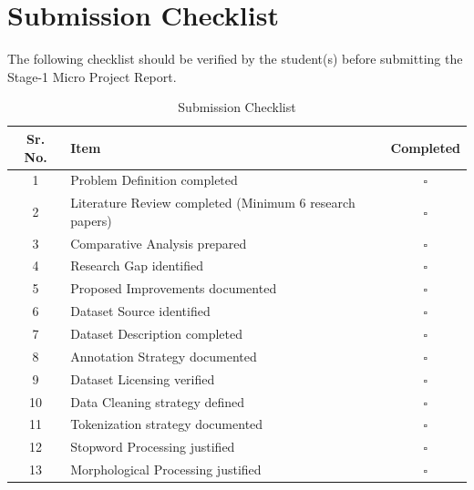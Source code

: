 \chapter*{Submission Checklist}
The following checklist should be verified by the student(s) before submitting the Stage-1 Micro Project Report.
\renewcommand{\arraystretch}{1}

\begin{table}[H]
\centering
\caption{Submission Checklist}
\begin{tabular}{|c|p{10cm}|c|}
\hline
\textbf{Sr. No.} & \textbf{Item} & \textbf{Completed} \\
\hline

1 & Problem Definition completed & $\square$ \\ \hline

2 & Literature Review completed (Minimum 6 research papers) & $\square$ \\ \hline

3 & Comparative Analysis prepared & $\square$ \\ \hline

4 & Research Gap identified & $\square$ \\ \hline

5 & Proposed Improvements documented & $\square$ \\ \hline

6 & Dataset Source identified & $\square$ \\ \hline

7 & Dataset Description completed & $\square$ \\ \hline

8 & Annotation Strategy documented & $\square$ \\ \hline

9 & Dataset Licensing verified & $\square$ \\ \hline

10 & Data Cleaning strategy defined & $\square$ \\ \hline

11 & Tokenization strategy documented & $\square$ \\ \hline

12 & Stopword Processing justified & $\square$ \\ \hline

13 & Morphological Processing justified & $\square$ \\ \hline


\end{tabular}
\end{table}
